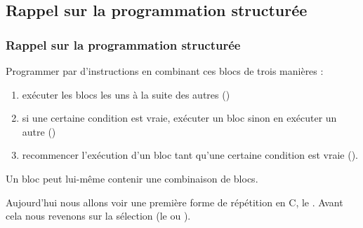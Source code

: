\documentclass[xcolor=svgnames]{beamer}
\begin{document}
\subsection{Rappel sur la programmation structurée}


\begin{frame}
  \frametitle{Rappel sur la programmation structurée \nowrite}
  \begin{definition}
    Programmer par  d'instructions en combinant ces blocs de trois manières :
    \begin{enumerate}
    \item exécuter les blocs les uns à la suite des autres ()
    \item si une certaine condition est vraie, exécuter un bloc sinon
      en exécuter un autre ()
    \item recommencer l'exécution d'un bloc tant qu'une certaine
      condition est vraie ().
    \end{enumerate}
    Un bloc peut lui-même contenir une combinaison de blocs.
  \end{definition}
\pause
Aujourd'hui nous allons voir une première forme de répétition en C, le
. Avant cela nous revenons sur la sélection  (le  ou ).
\end{frame}
\end{document}
